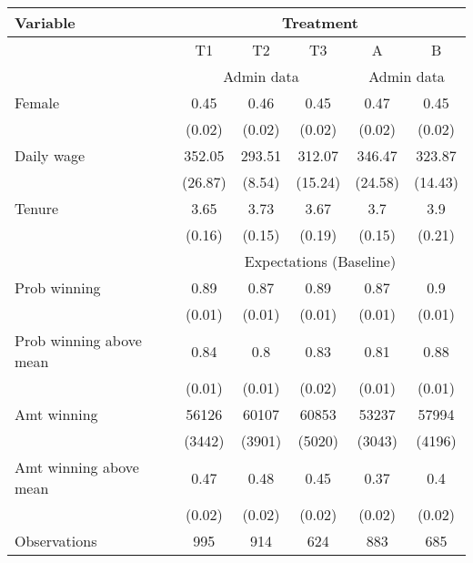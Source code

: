 \begin{tabular}{lccccc}
\toprule
Variable & \multicolumn{5}{c}{Treatment} \\
\midrule
\midrule
      & T1    & T2    & T3    & A     & B \\
\midrule
      & \multicolumn{3}{c}{Admin data} & \multicolumn{2}{c}{Admin data} \\
\midrule
\midrule
Female & 0.45  & 0.46  & 0.45  & 0.47  & 0.45 \\
      & (0.02) & (0.02) & (0.02) & (0.02) & (0.02) \\
Daily wage & 352.05 & 293.51 & 312.07 & 346.47 & 323.87 \\
      & (26.87) & (8.54) & (15.24) & (24.58) & (14.43) \\
Tenure & 3.65  & 3.73  & 3.67  & 3.7   & 3.9 \\
      & (0.16) & (0.15) & (0.19) & (0.15) & (0.21) \\
\midrule
      & \multicolumn{5}{c}{Expectations (Baseline)} \\
\midrule
\midrule
Prob winning & 0.89  & 0.87  & 0.89  & 0.87  & 0.9 \\
      & (0.01) & (0.01) & (0.01) & (0.01) & (0.01) \\
Prob winning above mean & 0.84  & 0.8   & 0.83  & 0.81  & 0.88 \\
      & (0.01) & (0.01) & (0.02) & (0.01) & (0.01) \\
Amt winning & 56126 & 60107 & 60853 & 53237 & 57994 \\
      & (3442) & (3901) & (5020) & (3043) & (4196) \\
Amt winning above mean & 0.47  & 0.48  & 0.45  & 0.37  & 0.4 \\
      & (0.02) & (0.02) & (0.02) & (0.02) & (0.02) \\
\midrule
Observations & 995   & 914   & 624   & 883   & 685 \\
\bottomrule
\bottomrule
\end{tabular}%
